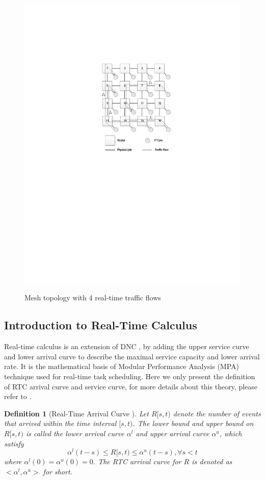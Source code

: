 \documentclass[10pt,journal]{IEEEtran}
\newtheorem{definition}{Definition}
\begin{document}
\begin{figure}
  \centering
  \includegraphics[scale=0.9]{figures/mesh.pdf}\\
  \caption{Mesh topology with 4 real-time traffic flows}\label{topology}
\end{figure}

\subsection{Introduction to Real-Time Calculus}\label{intrortc}
Real-time calculus is an extension of DNC \cite{1253607}, by adding the upper service curve and lower arrival curve to describe the maximal service capacity and lower arrival rate. It is the mathematical basis of Modular Performance Analysis (MPA) \cite{Wandeler2006System} technique used for real-time task scheduling. Here we only present the definition of RTC arrival curve and service curve, for more details about this theory, please refer to \cite{1253607}.
\begin{definition}[Real-Time Arrival Curve \cite{1253607}]
Let $R[s,t)$ denote the number of events that arrived within the time interval $[s,t)$. The lower bound and upper bound on $R[s,t)$ is called the lower arrival curve $\alpha^l$ and upper arrival curve $\alpha^u$, which satisfy
$$\alpha^l(t-s)\leq R[s,t)\leq \alpha^u(t-s),\forall s<t$$
where $\alpha^l(0)=\alpha^u(0)=0$. The RTC arrival curve for $R$ is denoted as $<\alpha^l,\alpha^u>$ for short.
\end{definition}
\end{document}
